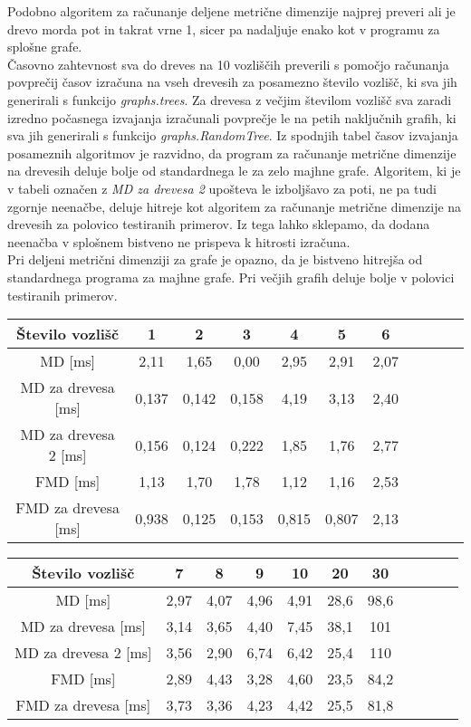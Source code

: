 \documentclass[a4paper]{report}
\begin{document}
Podobno algoritem za računanje deljene metrične dimenzije najprej preveri ali je drevo morda pot in takrat vrne 1, sicer pa nadaljuje enako kot v programu za splošne grafe. \\ 

Časovno zahtevnost sva do dreves na 10 vozliščih preverili s pomočjo računanja povprečij časov izračuna na vseh drevesih za posamezno število vozlišč, ki sva jih generirali s funkcijo \textit{graphs.trees}. Za drevesa z večjim številom vozlišč sva zaradi izredno počasnega izvajanja izračunali povprečje le na petih naključnih grafih, ki sva jih generirali s funkcijo \textit{graphs.RandomTree}. Iz spodnjih tabel časov izvajanja posameznih algoritmov je razvidno, da program za računanje metrične dimenzije na drevesih deluje bolje od standardnega le za zelo majhne grafe. Algoritem, ki je v tabeli označen z \textit{MD za drevesa 2} upošteva le izboljšavo za poti, ne pa tudi zgornje neenačbe, deluje hitreje kot algoritem za računanje metrične dimenzije na drevesih za polovico testiranih primerov. Iz tega lahko sklepamo, da dodana neenačba v splošnem bistveno ne prispeva k hitrosti izračuna. \\

Pri deljeni metrični dimenziji za grafe je opazno, da je bistveno hitrejša od standardnega programa za majhne grafe. Pri večjih grafih deluje bolje v polovici testiranih primerov.

\begin{center}
\begin{tabular}{||c| |*{10}{c|}|}
\hline\hline
Število vozlišč & 1 & 2 & 3 & 4 & 5 & 6 \\
\hline\hline
MD [ms] & 2,11 & 1,65 & 0,00 & 2,95 & 2,91 & 2,07 \\
\hline
MD za drevesa [ms] & 0,137 & 0,142 & 0,158 & 4,19 & 3,13 & 2,40 \\
\hline
MD za drevesa 2 [ms] & 0,156 & 0,124 & 0,222 & 1,85 & 1,76 & 2,77 \\
\hline\hline
FMD [ms] & 1,13 & 1,70 & 1,78 & 1,12 & 1,16 & 2,53 \\
\hline
FMD za drevesa [ms] & 0,938 & 0,125 & 0,153 & 0,815 & 0,807 & 2,13 \\
\hline\hline
\end{tabular}
\end{center}

\begin{center}
\begin{tabular}{||c| |*{10}{c|}|}
\hline\hline
Število vozlišč & 7 & 8 & 9 & 10 & 20 & 30 \\
\hline\hline
MD [ms] &  2,97 & 4,07 & 4,96 & 4,91 &  28,6 & 98,6 \\
\hline
MD za drevesa [ms] & 3,14 & 3,65 & 4,40 & 7,45 & 38,1 & 101 \\
\hline
MD za drevesa 2 [ms] & 3,56 & 2,90 & 6,74 & 6,42 & 25,4 & 110 \\
\hline\hline
FMD [ms] & 2,89 & 4,43 & 3,28 & 4,60 & 23,5 & 84,2 \\
\hline
FMD za drevesa [ms] & 3,73 & 3,36 & 4,23 & 4,42 & 25,5 & 81,8 \\
\hline\hline
\end{tabular}
\end{center}
\newpage
\end{document}
